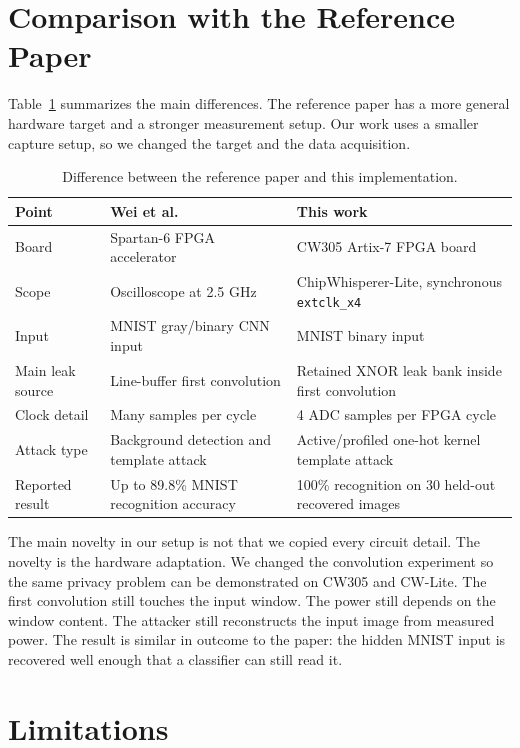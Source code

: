 \documentclass[10pt,conference]{IEEEtran}
\begin{document}
\section{Comparison with the Reference Paper}

Table~\ref{tab:compare} summarizes the main differences. The reference paper has
a more general hardware target and a stronger measurement setup. Our work uses a
smaller capture setup, so we changed the target and the data acquisition.

\begin{table}[t]
\centering
\caption{Difference between the reference paper and this implementation.}
\label{tab:compare}
\begin{tabular}{lll}
\toprule
Point & Wei et al. & This work \\
\midrule
Board & Spartan-6 FPGA accelerator & CW305 Artix-7 FPGA board \\
Scope & Oscilloscope at 2.5 GHz & ChipWhisperer-Lite, synchronous \texttt{extclk\_x4} \\
Input & MNIST gray/binary CNN input & MNIST binary input \\
Main leak source & Line-buffer first convolution & Retained XNOR leak bank inside first convolution \\
Clock detail & Many samples per cycle & 4 ADC samples per FPGA cycle \\
Attack type & Background detection and template attack & Active/profiled one-hot kernel template attack \\
Reported result & Up to 89.8\% MNIST recognition accuracy & 100\% recognition on 30 held-out recovered images \\
\bottomrule
\end{tabular}
\end{table}

The main novelty in our setup is not that we copied every circuit detail. The
novelty is the hardware adaptation. We changed the convolution experiment so the
same privacy problem can be demonstrated on CW305 and CW-Lite. The first
convolution still touches the input window. The power still depends on the
window content. The attacker still reconstructs the input image from measured
power. The result is similar in outcome to the paper: the hidden MNIST input is
recovered well enough that a classifier can still read it.

\section{Limitations}
\end{document}
